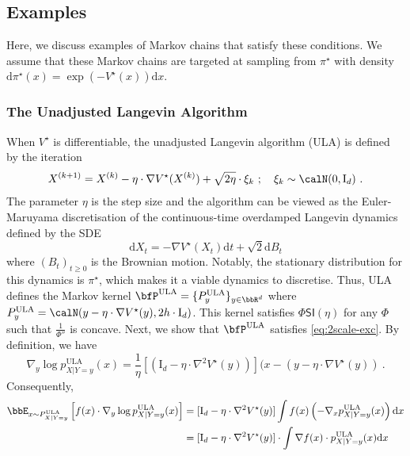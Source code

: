 \documentclass[11pt]{article}
\newcounter{ct}
\newcommand{\rmd}{\mathrm{d}}
\newcommand{\rmI}{\mathrm{I}}
\newcommand{\PhiSI}[1]{\Phi\mathsf{SI}\left(#1\right)}
\begin{document}
\subsection{Examples}

Here, we discuss examples of Markov chains that satisfy these conditions.
We assume that these Markov chains are targeted at sampling from \(\pi^{\star}\) with density \(\rmd\pi^{\star}(x) = \exp(-V^{\star}(x))\rmd x\).

\subsubsection{The Unadjusted Langevin Algorithm}
When \(V^{\star}\) is differentiable, the unadjusted Langevin algorithm (ULA) \citep{roberts1996exponential} is defined by the iteration
\begin{equation*}
    X^{(k + 1)} = X^{(k)} - \eta \cdot \nabla V^{\star}(X^{(k)}) + \sqrt{2\eta} \cdot \xi_{k}~; \quad \xi_{k} \sim \calN(0, \rmI_{d})~.
\end{equation*}
The parameter \(\eta\) is the step size and the algorithm can be viewed as the Euler-Maruyama discretisation of the continuous-time overdamped Langevin dynamics defined by the SDE
\begin{equation*}
    \rmd X_{t} = -\nabla V^{\star}(X_{t})\rmd t + \sqrt{2}\rmd B_{t}
\end{equation*}
where \((B_{t})_{t \geq 0}\) is the Brownian motion.
Notably, the stationary distribution for this dynamics is \(\pi^{\star}\), which makes it a viable dynamics to discretise.
Thus, ULA defines the Markov kernel \(\bfP^{\text{ULA}} = \{P^{\text{ULA}}_{y}\}_{y \in \bbR^{d}}\) where \(P^{\text{ULA}}_{y} = \calN(y - \eta \cdot \nabla V^{\star}(y), 2h \cdot \rmI_{d})\).
This kernel satisfies \(\PhiSI{\eta}\) \citep[Cor 2.1]{chafai2004entropies} for any \(\Phi\) such that \(\frac{1}{\Phi''}\) is concave.
Next, we show that \(\bfP^{\text{ULA}}\) satisfies \ref{eq:2scale-exc}.
By definition, we have
\begin{equation*}
    \nabla_{y}\log p_{X | Y = y}^{\text{ULA}}(x) = \frac{1}{\eta} \left[(\rmI_{d} - \eta \cdot \nabla^{2}V^{\star}(y))\right](x - (y - \eta \cdot \nabla V^{\star}(y))~.
\end{equation*}
Consequently,
\begin{align*}
    \bbE_{x \sim P_{X | Y = y}^{\text{ULA}}}\left[f(x) \cdot \nabla_{y} \log p_{X | Y = y}^{\text{ULA}}(x) \right] &= [\rmI_{d} - \eta \cdot \nabla^{2}V^{\star}(y)] \int f(x) \left(- \nabla_{x} p_{X | Y = y}^{\text{ULA}}(x)\right) \rmd x \\
    &= [\rmI_{d} - \eta \cdot \nabla^{2}V^{\star}(y)] \cdot \int \nabla f(x) \cdot p_{X | Y = y}^{\text{ULA}}(x) \rmd x
\end{align*}
\end{document}
